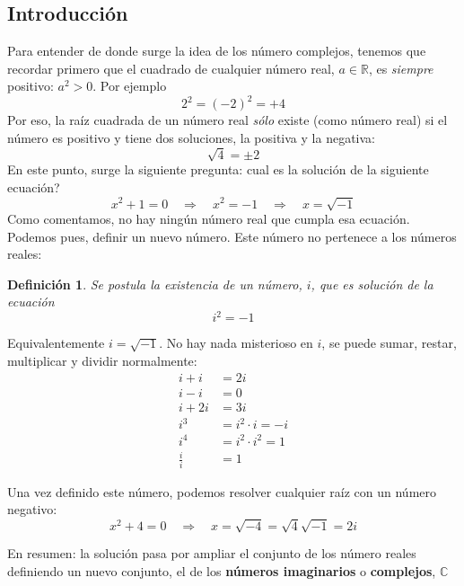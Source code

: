 \documentclass[a4paper,11pt]{book} %
\newtheorem{definicion_contador}{Definición}
\newcommand{\Definicion}[1]{
		\begin{mybox_gray2}{}
			\begin{definicion_contador}
				 #1 
			\end{definicion_contador} 
		\end{mybox_gray2}
	}
\numberwithin{equation}{chapter}
\def\rqa{\quad \Rightarrow \quad}
\begin{document}
		\subsection{Introducción}
		
Para entender de donde surge la idea de los número complejos, tenemos que recordar primero que el cuadrado de cualquier número real, $a \in \mathbb{R}$, es \textit{siempre} positivo: $a^2 > 0$. Por ejemplo
	\begin{equation*}
	2^2 = (-2)^2 = +4
	\end{equation*}
Por eso, la raíz cuadrada de un número real \textit{sólo} existe (como número real) si el número es positivo y tiene dos soluciones, la positiva y la negativa:
	\begin{equation*}
	\sqrt{4} = \pm 2
	\end{equation*}
En este punto, surge la siguiente pregunta: cual es la solución de la siguiente ecuación?
	\begin{equation}
	x^2 + 1 = 0 \rqa x^2 = -1 \rqa x = \sqrt{-1}
	\end{equation}
Como comentamos, no hay ningún número real que cumpla esa ecuación. Podemos pues, definir un nuevo número. Este número no pertenece a los números reales:

	\Definicion{
	Se postula la existencia de un número, $i$, que es solución de la ecuación
	\begin{equation}
	i^2 = -1
	\end{equation}
	}

Equivalentemente $i = \sqrt{-1}$. No hay nada misterioso en $i$, se puede sumar, restar, multiplicar y dividir normalmente:
	\begin{align*}
	i + i & = 2i \\
	i - i & = 0 \\
	i + 2i & = 3i \\
	i^3 & = i^2 \cdot i = -i \\
	i^4 & = i^2 \cdot i^2  = 1 \\
	\frac{i}{i} & = 1
	\end{align*}

Una vez definido este número, podemos resolver cualquier raíz con un número negativo:
	\begin{equation}
	x^2 + 4 = 0  \rqa x = \sqrt{-4} = \sqrt{4} \sqrt{-1} = 2i
	\end{equation}

En resumen: la solución pasa por ampliar el conjunto de los número reales definiendo un nuevo conjunto, el de los \textbf{números imaginarios} o \textbf{complejos}, $\mathbb{C}$
\end{document}
